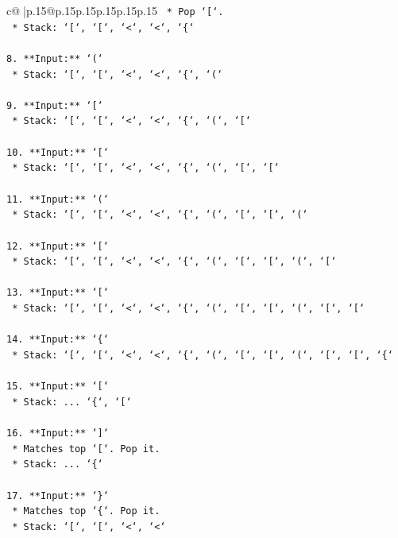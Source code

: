 \documentclass{article}
\begin{document}
{\begin{supertabular}{c@{$\;$}|p{.15\linewidth}@{}p{.15\linewidth}p{.15\linewidth}p{.15\linewidth}p{.15\linewidth}p{.15\linewidth}}
{{{\texttt{    *   Pop `{[}`.} \\
\texttt{    *   Stack: `{[}`, `{[}`, `<`, `<`, `\{`} \\
\\ 
\texttt{8.  **Input:** `(`} \\
\texttt{    *   Stack: `{[}`, `{[}`, `<`, `<`, `\{`, `(`} \\
\\ 
\texttt{9.  **Input:** `{[}`} \\
\texttt{    *   Stack: `{[}`, `{[}`, `<`, `<`, `\{`, `(`, `{[}`} \\
\\ 
\texttt{10. **Input:** `{[}`} \\
\texttt{    *   Stack: `{[}`, `{[}`, `<`, `<`, `\{`, `(`, `{[}`, `{[}`} \\
\\ 
\texttt{11. **Input:** `(`} \\
\texttt{    *   Stack: `{[}`, `{[}`, `<`, `<`, `\{`, `(`, `{[}`, `{[}`, `(`} \\
\\ 
\texttt{12. **Input:** `{[}`} \\
\texttt{    *   Stack: `{[}`, `{[}`, `<`, `<`, `\{`, `(`, `{[}`, `{[}`, `(`, `{[}`} \\
\\ 
\texttt{13. **Input:** `{[}`} \\
\texttt{    *   Stack: `{[}`, `{[}`, `<`, `<`, `\{`, `(`, `{[}`, `{[}`, `(`, `{[}`, `{[}`} \\
\\ 
\texttt{14. **Input:** `\{`} \\
\texttt{    *   Stack: `{[}`, `{[}`, `<`, `<`, `\{`, `(`, `{[}`, `{[}`, `(`, `{[}`, `{[}`, `\{`} \\
\\ 
\texttt{15. **Input:** `{[}`} \\
\texttt{    *   Stack: ... `\{`, `{[}`} \\
\\ 
\texttt{16. **Input:** `{]}`} \\
\texttt{    *   Matches top `{[}`. Pop it.} \\
\texttt{    *   Stack: ... `\{`} \\
\\ 
\texttt{17. **Input:** `\}`} \\
\texttt{    *   Matches top `\{`. Pop it.} \\
\texttt{    *   Stack: `{[}`, `{[}`, `<`, `<`} \\
\\ 
}}}
\end{supertabular}}
\end{document}
